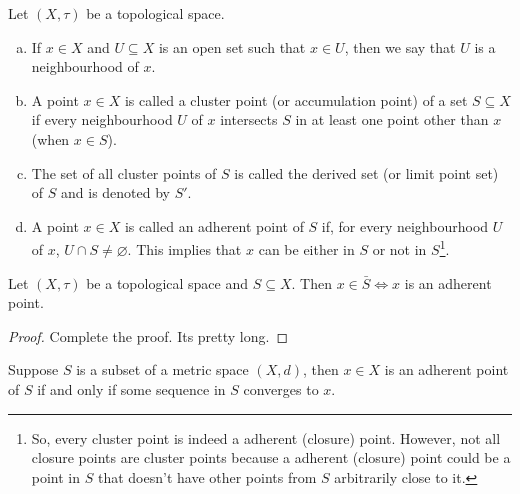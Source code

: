 \begin{definition}
    Let $(X, \tau)$ be a topological space. 
    \begin{enumerate}[(a)]
        \item If  $x \in X$ and $U \subseteq X$ is an open set such that $x \in U$, then we say that $U$ is a neighbourhood of $x$.
        \item A point $x \in X$ is called a cluster point (or accumulation point) of a set $S \subseteq X$ if every neighbourhood $U$ of $x$ intersects $S$ in at least one point other than $x$ (when $x \in S$).
        \item The set of all cluster points of $S$ is called the derived set (or limit point set) of $S$ and is denoted by $S'$.
        \item A point $x \in X$ is called an adherent point of $S$ if, for every neighbourhood $U$ of $x$, $U \cap S \neq \varnothing$. This implies that $x$ can be either in \( S \) or not in \( S \)\footnote{So, every cluster point is indeed a adherent (closure) point. However, not all closure points are cluster points because a adherent (closure) point could be a point in $S$ that doesn't have other points from $S$ arbitrarily close to it.}.
    \end{enumerate}
\end{definition}

\begin{lemma}
    Let $(X,\tau)$ be a topological space and $S \subseteq X$. Then $x \in \bar{S} \iff x$ is an adherent point. 
\end{lemma}
\begin{proof}
    Complete the proof. Its pretty long.
\end{proof}


\begin{proposition}
    Suppose $S$ is a subset of a metric space $(X,d)$, then $x \in X$ is an adherent point of $S$ if and only if some sequence in $S$ converges to $x$. 
\end{proposition}

